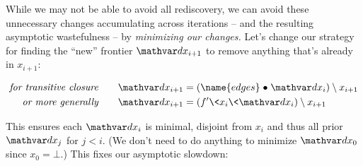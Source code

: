 While we may not be able to avoid all rediscovery, we can avoid these unnecessary changes accumulating across iterations -- and the resulting asymptotic wastefulness -- by \emph{minimizing our changes.}
%
Let's change our strategy for finding the ``new'' frontier $\dx_{i+1}$ to remove anything that's already in $x_{i+1}$:

\begin{align*}
  \textit{for transitive closure}
  \qquad
  \dx_{i+1} &= (\name{edges} \relcomp \dx_i) \setminus x_{i+1}
  \\
  \textit{or more generally}
  \qquad
  \dx_{i+1} &= (f' \<x_i \<\dx_i) \setminus x_{i+1}
\end{align*}

\noindent
This ensures each $\dx_i$ is minimal, disjoint from $x_i$ and thus all prior $\dx_j$ for $j < i$. (We don't need to do anything to minimize $\dx_0$ since $x_0 = \bot$.) This fixes our asymptotic slowdown:


